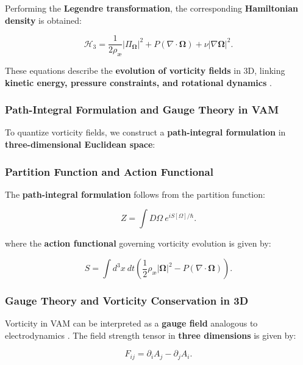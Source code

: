     Performing the \textbf{Legendre transformation}, the corresponding \textbf{Hamiltonian density} is obtained:

    \begin{equation*}
        \mathcal{H}_3 = \frac{1}{2 \rho_{\text{æ}}} |\Pi_{\boldsymbol{\Omega}}|^2 + P (\nabla \cdot \boldsymbol{\Omega}) + \nu |\nabla \boldsymbol{\Omega}|^2.
    \end{equation*}

    These equations describe the \textbf{evolution of vorticity fields} in 3D, linking \textbf{kinetic energy, pressure constraints, and rotational dynamics} \cite{lamb1945hydrodynamics}.

    \subsubsection*{Path-Integral Formulation and Gauge Theory in VAM}
    To quantize vorticity fields, we construct a \textbf{path-integral formulation} in \textbf{three-dimensional Euclidean space}:

    \subsubsection*{Partition Function and Action Functional}
    The \textbf{path-integral formulation} follows from the partition function:

    \begin{equation*}
        Z = \int D\Omega \ e^{iS[\Omega]/\hbar}.
    \end{equation*}

    where the \textbf{action functional} governing vorticity evolution is given by:

    \begin{equation*}
        S = \int d^3x \ dt \left( \frac{1}{2} \rho_{\text{æ}} |\boldsymbol{\Omega}|^2 - P (\nabla \cdot \boldsymbol{\Omega}) \right).
    \end{equation*}

    \subsubsection*{Gauge Theory and Vorticity Conservation in 3D}
    Vorticity in VAM can be interpreted as a \textbf{gauge field} analogous to electrodynamics \cite{jackson1999classical}. The field strength tensor in \textbf{three dimensions} is given by:

    \begin{equation*}
        F_{ij} = \partial_i A_j - \partial_j A_i.
    \end{equation*}

